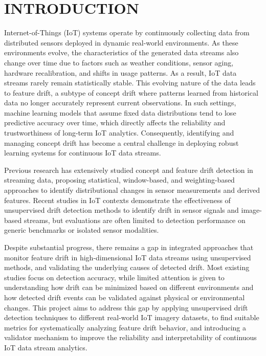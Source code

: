 \documentclass[journal]{IEEEtran} %
\begin{document}
\begin{IEEEkeywords}
Internet of Things, Feature Drift Detection, Autoencoder, Reconstruction Loss, Latent Space, Image Streams, Seasonal Drift}
\end{IEEEkeywords}

\section{INTRODUCTION}

Internet-of-Things (IoT) systems operate by continuously collecting data from distributed sensors deployed in dynamic real-world environments. As these environments evolve, the characteristics of the generated data streams also change over time due to factors such as weather conditions, sensor aging, hardware recalibration, and shifts in usage patterns. As a result, IoT data streams rarely remain statistically stable. This evolving nature of the data leads to feature drift, a subtype of concept drift where patterns learned from historical data no longer accurately represent current observations. In such settings, machine learning models that assume fixed data distributions tend to lose predictive accuracy over time, which directly affects the reliability and trustworthiness of long-term IoT analytics. Consequently, identifying and managing concept drift has become a central challenge in deploying robust learning systems for continuous IoT data streams\cite{one}.

Previous research has extensively studied concept and feature drift detection in streaming data, proposing statistical, window-based, and weighting-based approaches to identify distributional changes in sensor measurements and derived features\cite{two,three}. Recent studies in IoT contexts demonstrate the effectiveness of unsupervised drift detection methods to identify drift in sensor signals and image-based streams, but evaluations are often limited to detection performance on generic benchmarks or isolated sensor modalities\cite{four,five, six, ten}.

Despite substantial progress, there remains a gap in integrated approaches that monitor feature drift in high-dimensional IoT data streams using unsupervised methods\cite{three, four, ten}, and validating the underlying causes of detected drift. Most existing studies focus on detection accuracy, while limited attention is given to understanding how drift can be minimized based on different environments and how detected drift events can be validated against physical or environmental changes. This project aims to address this gap by applying unsupervised drift detection techniques to different real-world IoT imagery datasets, to find suitable metrics for systematically analyzing feature drift behavior, and introducing a validator mechanism to improve the reliability and interpretability of continuous IoT data stream analytics.
\end{document}
